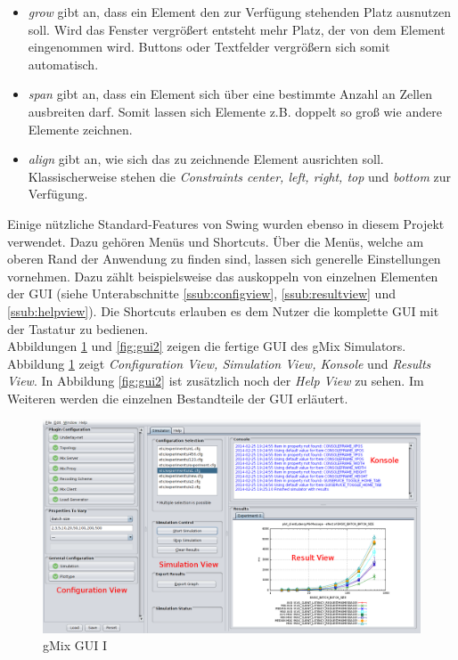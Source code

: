 \documentclass[a4paper, 11pt]{article} %
\begin{document}
\begin{itemize}
\item \emph{grow} gibt an, dass ein Element den zur Verfügung stehenden Platz ausnutzen soll. Wird das Fenster vergrößert entsteht mehr Platz, der von dem Element eingenommen wird. Buttons oder Textfelder vergrößern sich somit automatisch.
\item \emph{span} gibt an, dass ein Element sich über eine bestimmte Anzahl an Zellen ausbreiten darf. Somit lassen sich Elemente z.B. doppelt so groß wie andere Elemente zeichnen.
\item \emph{align} gibt an, wie sich das zu zeichnende Element ausrichten soll. Klassischerweise stehen die \emph{Constraints center, left, right, top} und \emph{bottom} zur Verfügung. 
\end{itemize}

Einige nützliche Standard-Features von Swing wurden ebenso in diesem Projekt verwendet. Dazu gehören Menüs und Shortcuts. Über die Menüs, welche am oberen Rand der Anwendung zu finden sind, lassen sich generelle Einstellungen vornehmen. Dazu zählt beispielsweise das auskoppeln von einzelnen Elementen der GUI (siehe Unterabschnitte \ref{ssub:configview}, \ref{ssub:resultview} und \ref{ssub:helpview}). Die Shortcuts erlauben es dem Nutzer die komplette GUI mit der Tastatur zu bedienen. \\

Abbildungen \ref{fig:gui1} und \ref{fig:gui2} zeigen die fertige GUI des gMix Simulators. Abbildung \ref{fig:gui1} zeigt \emph{Configuration View, Simulation View, Konsole} und \emph{Results View}. In Abbildung \ref{fig:gui2} ist zusätzlich noch der \emph{Help View} zu sehen. Im Weiteren werden die einzelnen Bestandteile der GUI erläutert.

\begin{figure}[!htp]
\includegraphics[width=\textwidth]{img/gmixGuiSimulator}
\caption{gMix GUI I}
\label{fig:gui1}
\end{figure}
\end{document}
